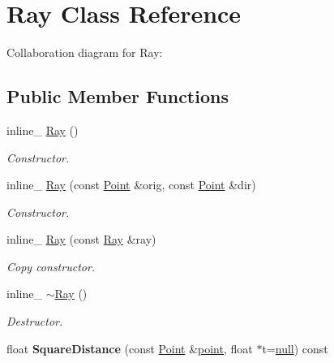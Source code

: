 \hypertarget{class_ray}{\section{Ray Class Reference}
\label{class_ray}
}


Collaboration diagram for Ray\+:
\subsection*{Public Member Functions}
\begin{DoxyCompactItemize}
\item 
\hypertarget{class_ray_aad41f50d3c33b8d43d5d6bb364d7b44f}{inline\+\_\+ \hyperlink{class_ray_aad41f50d3c33b8d43d5d6bb364d7b44f}{Ray} ()}\label{class_ray_aad41f50d3c33b8d43d5d6bb364d7b44f}

\begin{DoxyCompactList}\small\item\em Constructor. \end{DoxyCompactList}\item 
\hypertarget{class_ray_ad54775e1b3e5497684e90f6fa4c77d1b}{inline\+\_\+ \hyperlink{class_ray_ad54775e1b3e5497684e90f6fa4c77d1b}{Ray} (const \hyperlink{class_point}{Point} \&orig, const \hyperlink{class_point}{Point} \&dir)}\label{class_ray_ad54775e1b3e5497684e90f6fa4c77d1b}

\begin{DoxyCompactList}\small\item\em Constructor. \end{DoxyCompactList}\item 
\hypertarget{class_ray_a057ae4c83faa2d07daca87d80f368485}{inline\+\_\+ \hyperlink{class_ray_a057ae4c83faa2d07daca87d80f368485}{Ray} (const \hyperlink{class_ray}{Ray} \&ray)}\label{class_ray_a057ae4c83faa2d07daca87d80f368485}

\begin{DoxyCompactList}\small\item\em Copy constructor. \end{DoxyCompactList}\item 
\hypertarget{class_ray_a1cdd7df15786c6c537839053c4b9407c}{inline\+\_\+ \hyperlink{class_ray_a1cdd7df15786c6c537839053c4b9407c}{$\sim$\+Ray} ()}\label{class_ray_a1cdd7df15786c6c537839053c4b9407c}

\begin{DoxyCompactList}\small\item\em Destructor. \end{DoxyCompactList}\item 
\hypertarget{class_ray_af768696653b687f4ec0d23f5973fba39}{float {\bfseries Square\+Distance} (const \hyperlink{class_point}{Point} \&\hyperlink{structpoint}{point}, float $\ast$t=\hyperlink{_ice_types_8h_ac97b8ee753e4405397a42ad5799b0f9e}{null}) const }\label{class_ray_af768696653b687f4ec0d23f5973fba39}


\end{DoxyCompactItemize}
